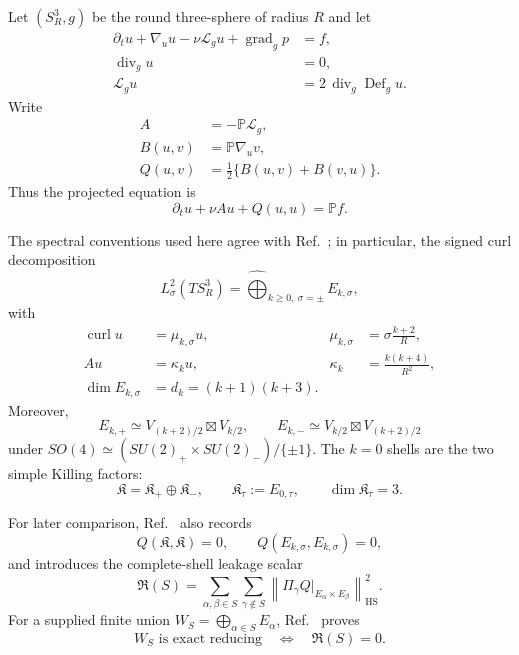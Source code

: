 \documentclass[
 aps,
 prd,
 reprint,
 amsmath,
 amssymb,
 nofootinbib,
 superscriptaddress
]{revtex4-2}
\theoremstyle{definition}
\theoremstyle{remark}
\newcommand{\Sthree}{S^3_R}
\newcommand{\PP}{\mathbb P}
\newcommand{\cK}{\mathfrak K}
\newcommand{\cKp}{\mathfrak K_+}
\newcommand{\cKm}{\mathfrak K_-}
\newcommand{\cL}{\mathcal L}
\newcommand{\curl}{\operatorname{curl}}
\newcommand{\divg}{\operatorname{div}_g}
\newcommand{\gradg}{\operatorname{grad}_g}
\newcommand{\Def}{\operatorname{Def}}
\begin{document}
Let $(\Sthree,g)$ be the round three-sphere of radius $R$ and let
\begin{align*}
 \partial_t u+\nabla_u u-\nu\cL_g u+\gradg p&=f,\\
 \divg u&=0,\\
 \cL_g u&=2\,\operatorname{div}_g\Def_g u .
\end{align*}
Write
\begin{align*}
 A&=-\PP\cL_g,\\
 B(u,v)&=\PP\nabla_u v,\\
 Q(u,v)&=\frac12\{B(u,v)+B(v,u)\}.
\end{align*}
Thus the projected equation is
\begin{equation}
 \partial_tu+\nu Au+Q(u,u)=\PP f.
 \label{eq:NSproj}
\end{equation}

The spectral conventions used here agree with Ref.~\cite{PreeceBatenin2026}; in particular, the signed curl decomposition
\[
 L^2_\sigma(T\Sthree)
 =
 \widehat{\bigoplus}_{k\ge0,\ \sigma=\pm}E_{k,\sigma},
\]
with
\begin{align}
 \curl u&=\mu_{k,\sigma}u,
 & \mu_{k,\sigma}&=\sigma\frac{k+2}{R},
 \label{eq:curlspec}\\
 Au&=\kappa_k u,
 & \kappa_k&=\frac{k(k+4)}{R^2},
 \label{eq:stokespec}\\
 \dim E_{k,\sigma}&=d_k=(k+1)(k+3).
 \label{eq:dim}
\end{align}
Moreover,
\begin{equation}
 E_{k,+}\simeq V_{(k+2)/2}\boxtimes V_{k/2},
 \qquad
 E_{k,-}\simeq V_{k/2}\boxtimes V_{(k+2)/2}
 \label{eq:irreps}
\end{equation}
under
$SO(4)\simeq(SU(2)_+\times SU(2)_-)/\{\pm1\}$.
The $k=0$ shells are the two simple Killing factors:
\[
 \cK=\cKp\oplus\cKm,
 \qquad
 \cK_\tau:=E_{0,\tau},
 \qquad \dim\cK_\tau=3.
\]

For later comparison, Ref.~\cite{PreeceBatenin2026} also records
\begin{equation}
 Q(\cK,\cK)=0,
 \qquad
 Q(E_{k,\sigma},E_{k,\sigma})=0,
 \label{eq:diagonalzero}
\end{equation}
and introduces the complete-shell leakage scalar
\[
 \mathfrak R(S)=
 \sum_{\alpha,\beta\in S}\sum_{\gamma\notin S}
 \left\|\Pi_\gamma
 Q\big|_{E_\alpha\times E_\beta}\right\|_{\mathrm{HS}}^2.
\]
For a supplied finite union
$W_S=\bigoplus_{\alpha\in S}E_\alpha$,
Ref.~\cite{PreeceBatenin2026} proves
\begin{equation}
 W_S\text{ is exact reducing}
 \quad\Longleftrightarrow\quad
 \mathfrak R(S)=0.
 \label{eq:Rcriterion}
\end{equation}
\end{document}
